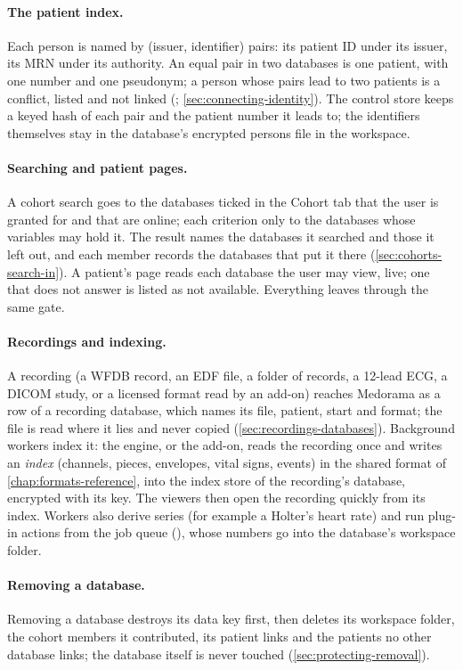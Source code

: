 \paragraph{The patient index.} Each person is named by (issuer, identifier) pairs: its patient ID
under its issuer, its MRN under its authority. An equal pair in two databases is one patient, with
one number and one pseudonym; a person whose pairs lead to two patients is a conflict, listed and
not linked (; \cref{sec:connecting-identity}). The control store keeps a keyed
hash of each pair and the patient number it leads to; the identifiers themselves stay in the
database's encrypted persons file in the workspace.

\paragraph{Searching and patient pages.} A cohort search goes to the databases ticked in the
Cohort tab that the user is granted for  and that are online; each criterion only to
the databases whose variables may hold it. The result names the databases it searched and those it
left out, and each member records the databases that put it there (\cref{sec:cohorts-search-in}).
A patient's page reads each database the user may view, live; one that does not answer is listed
as not available. Everything leaves through the same gate.

\paragraph{Recordings and indexing.} A recording (a WFDB record, an EDF file, a folder of
records, a 12-lead ECG, a DICOM study, or a licensed format read by an add-on) reaches Medorama as
a row of a recording database, which names its file, patient, start and format; the file is read
where it lies and never copied (\cref{sec:recordings-databases}). Background workers index it: the
engine, or the add-on, reads the recording once and writes an \emph{index} (channels, pieces,
envelopes, vital signs, events) in the shared format of \cref{chap:formats-reference}, into
the index store of the recording's database, encrypted with its key. The viewers then open the recording quickly from its index. Workers also derive
series (for example a Holter's heart rate) and run plug-in actions from the job queue
(), whose numbers go into the database's workspace folder.

\paragraph{Removing a database.} Removing a database destroys its data key first, then deletes its
workspace folder, the cohort members it contributed, its patient links and the patients no other
database links; the database itself is never touched (\cref{sec:protecting-removal}).

